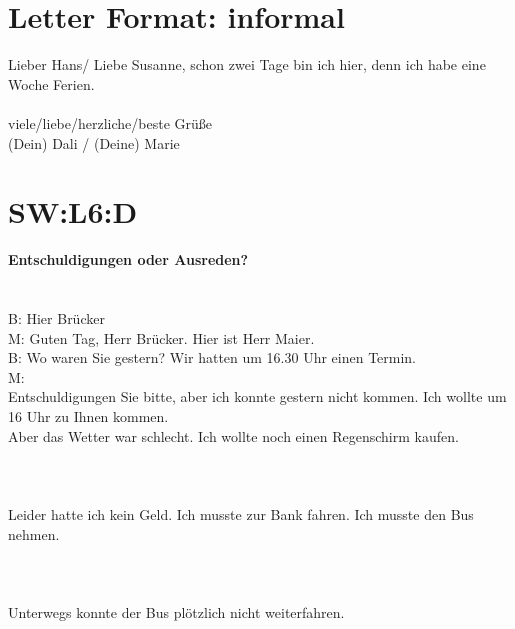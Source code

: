 \section{Letter Format: informal}
\noindent
Lieber Hans/ Liebe Susanne,
schon zwei Tage bin ich hier, denn ich habe eine Woche Ferien.  \\
\\
\noindent
viele/liebe/herzliche/beste Grüße \\
(Dein) Dali / (Deine) Marie \\

\section{SW:L6:D}
\noindent
\textbf{Entschuldigungen oder Ausreden?} \\
\\
\\
\noindent
B: Hier Brücker \\
M: Guten Tag, Herr Brücker. Hier ist Herr Maier. \\
B: Wo waren Sie gestern? Wir hatten um 16.30 Uhr einen Termin. \\
M: \\
Entschuldigungen Sie bitte, aber ich konnte gestern nicht kommen. Ich wollte um 16 Uhr zu Ihnen kommen.  \\
Aber das Wetter war schlecht. Ich wollte noch einen Regenschirm kaufen.  \\
\\
\\
\\
\noindent
Leider hatte ich kein Geld. Ich musste zur Bank fahren.  Ich musste den Bus nehmen. \\
\\
\\
\\
\noindent
Unterwegs konnte der Bus plötzlich nicht weiterfahren.  \\
